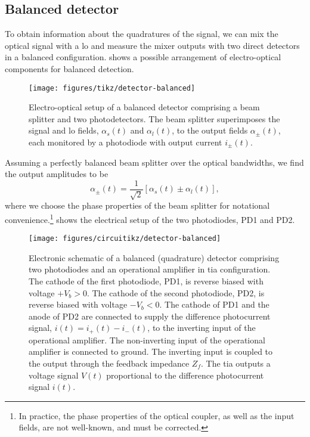 \FloatBarrier
\subsection{Balanced detector}

To obtain information about the quadratures of the signal, we can mix the optical signal with a \gls{lo} and measure the mixer outputs with two direct detectors in a balanced configuration.
 shows a possible arrangement of electro-optical components for balanced detection.
\begin{figure}[htb]
    \centering
    \texttt{[image: figures/tikz/detector-balanced]}
    \caption{Electro-optical setup of a balanced detector comprising a beam splitter and two photodetectors. The beam splitter superimposes the signal and \gls{lo} fields, $\alpha_s(t)$ and $\alpha_l(t)$, to the output fields $\alpha_\pm(t)$, each monitored by a photodiode with output current $i_\pm(t)$.}\label{fig:detector_balanced_optics}
\end{figure}
Assuming a perfectly balanced beam splitter over the optical bandwidths, we find the output amplitudes to be
\begin{equation}
	\alpha_\pm(t)
	=
	\frac{1}{\sqrt{2}}
	\left[
		\alpha_s(t)
		\pm
		\alpha_l(t)
	\right]
	\label{eq:detector_balanced_amplitudes}
	,
\end{equation}
where we choose the phase properties of the beam splitter for notational convenience.\footnote{In practice, the phase properties of the optical coupler, as well as the input fields, are not well-known, and must be corrected.}
 shows the electrical setup of the two photodiodes, PD1 and PD2.
\begin{figure}[htb]
    \centering
    \texttt{[image: figures/circuitikz/detector-balanced]}
    \caption{Electronic schematic of a balanced (quadrature) detector comprising two photodiodes and an operational amplifier in \gls{tia} configuration. The cathode of the first photodiode, PD1, is reverse biased with voltage $+V_b>0$. The cathode of the second photodiode, PD2, is reverse biased with voltage $-V_b<0$. The cathode of PD1 and the anode of PD2 are connected to supply the difference photocurrent signal, $i(t)=i_+(t)-i_-(t)$, to the inverting input of the operational amplifier. The non-inverting input of the operational amplifier is connected to ground. The inverting input is coupled to the output through the feedback impedance $Z_f$. The \gls{tia} outputs a voltage signal $V(t)$ proportional to the difference photocurrent signal $i(t)$.}\label{fig:detector_balanced_electronics}
\end{figure}
